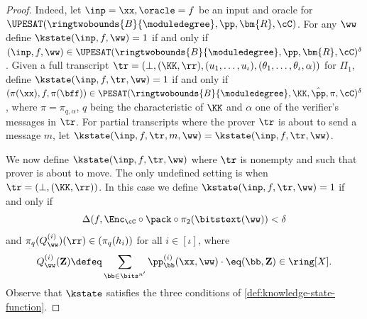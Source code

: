 \begin{proof}
    Indeed, let $\inp=\xx, \oracle=f$ be an input and oracle for $\UPESAT(\ringtwobounds{B}{\moduledegree}, \pp,\bm{R}, \cC)$. For any $\ww$ define $\kstate(\inp,f, \ww)=1$ if and only if $(\inp,f,\ww)\in \UPESAT(\ringtwobounds{B}{\moduledegree}, \pp,\bm{R}, \cC)^\delta$. Given a full transcript $\tr=(\bot, (\KK,\rr),  (u_1,\ldots, u_\iota),(\theta_1,\ldots, \theta_\iota, \alpha))$ for $\Pi_{1}$, define $\kstate(\inp, f, \tr, \ww) = 1$ if and only if $(\pi(\xx), f, \pi(\bff))\in \PESAT(\ringtwobounds{B}{\moduledegree}, \KK, \hat{\pp},  \pi, \cC)^\delta$, where $\pi=\pi_{q,\alpha}$, $q$ being the characteristic of $\KK$ and $\alpha$ one of the verifier's messages in $\tr$. For partial transcripts where the prover $\tr$ is about to send a message $m$, let $\kstate(\inp,f,\tr, m, \ww) = \kstate(\inp, f,\tr,\ww)$. 

    We now define  $\kstate(\inp, f, \tr, \ww)$ where $\tr$ is nonempty and such that prover is about to move.  The only undefined setting is when $\tr=(\bot, (\KK,\rr))$. In this case we define $\kstate(\inp, f, \tr, \ww) = 1$ if and only if $$\Delta(f,\Enc_\cC\circ \pack \circ \pi_2(\bitstext(\ww)) < \delta$$ and $\pi_q(Q_{\ww}^{(i)})(\rr)\in (\pi_q(h_i))$ for all $i\in [\iota]$,  where 
    $$
    Q_{\ww}^{(i)}(\mathbf{Z})\defeq\sum_{\bb\in\bits^{n'}}\pp_{\bb}^{(i)}(\xx,\ww) \cdot \eq(\bb, \mathbf{Z}) \in \ring[X]. 
$$
%
Observe that $\kstate$ satisfies the three conditions of \cref{def:knowledge-state-function}.

      


\end{proof}
